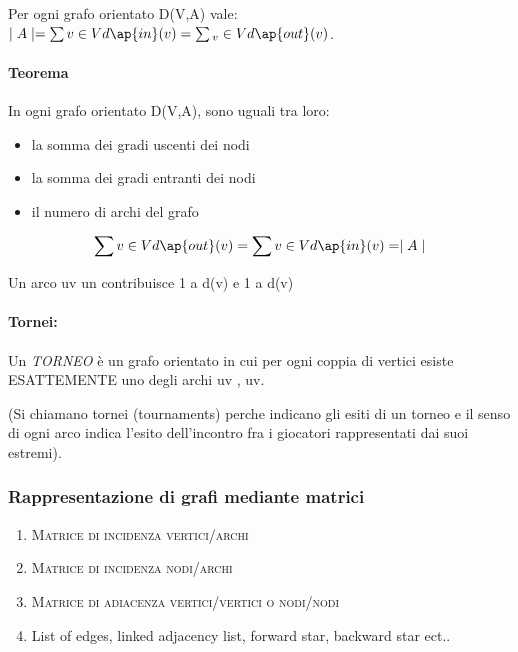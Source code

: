 \documentclass[12pt,a4paper]{article}
\begin{document}
Per ogni grafo orientato D(V,A) vale: \( \mid A \mid = \sum{v \in V} d\ap{in}(v) = \sum{_v \in V} d\ap{out}(v) \). \\

\paragraph{Teorema} In ogni grafo orientato D(V,A), sono uguali tra loro:
\begin{itemize}
\item la somma dei gradi uscenti dei nodi
\item la somma dei gradi entranti dei nodi
\item il numero di archi del grafo
\end{itemize}

\begin{equation}
    \sum{v \in V} d\ap{out}(v) = \sum{v \in V} d\ap{in}(v) = \mid A \mid 
\end{equation}

Un arco uv un contribuisce 1 a d(v) e 1 a d(v)
\\

\paragraph{Tornei:} Un \textit{TORNEO} è un grafo orientato in cui per ogni coppia di vertici esiste \textsc{ESATTEMENTE} uno degli archi uv , uv. \par
(Si chiamano tornei (tournaments) perche indicano gli esiti di un torneo e il senso di ogni arco indica l'esito dell'incontro fra i giocatori rappresentati dai suoi estremi).

\subsubsection{Rappresentazione di grafi mediante matrici}
\begin{enumerate}
\item \textsc{Matrice di incidenza vertici/archi}
\item \textsc{Matrice di incidenza nodi/archi}
\item \textsc{Matrice di adiacenza vertici/vertici o nodi/nodi}
\item List of edges, linked adjacency list, forward star, backward star ect..
\end{enumerate}
\end{document}
